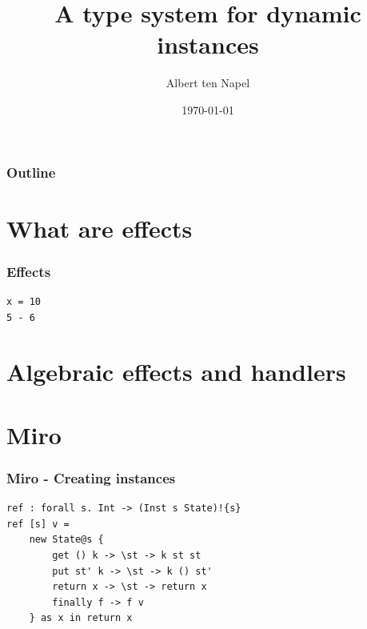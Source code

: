 \documentclass{beamer}
\title[A type system for dynamic instances]{A type system for dynamic instances}
\institute[TU Delft]{Delft University of Technology}
\author{Albert ten Napel}
\date{\today}
\newcommand*\titleTOC{Outline}
\begin{document}
{
%
\frame{\titlepage}
}

{
\begin{frame}\frametitle{\titleTOC}
	\tableofcontents
\end{frame}
}

\section{What are effects}

\begin{frame}[fragile]\frametitle{Effects}
	\begin{example}
		\begin{verbatim}
x = 10
5 - 6
		\end{verbatim}
	\end{example}
\end{frame}

\section{Algebraic effects and handlers}

\section{Miro}

\begin{frame}[fragile]\frametitle{Miro - Creating instances}
\begin{example}
\begin{verbatim}
ref : forall s. Int -> (Inst s State)!{s}
ref [s] v =
	new State@s {
		get () k -> \st -> k st st
		put st' k -> \st -> k () st'
		return x -> \st -> return x
		finally f -> f v
	} as x in return x
\end{verbatim}
\end{example}
\end{frame}
\end{document}
